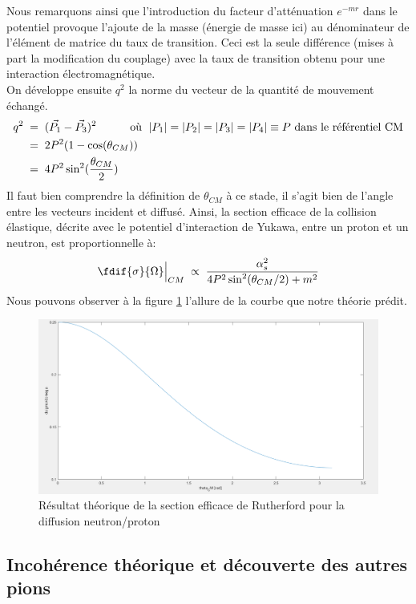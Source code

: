 Nous remarquons ainsi que l'introduction du facteur d'atténuation $e^{-mr}$ dans le potentiel provoque l'ajoute de la masse (énergie de masse ici) au dénominateur de l'élément de matrice du taux de transition. Ceci est la seule différence (mises à part la modification du couplage) avec la taux de transition obtenu pour une interaction électromagnétique.\\
On développe ensuite $q^2$ la norme du vecteur de la quantité de mouvement échangé.
\begin{align*}
    q^2 &\; = \; (\Vec{P_1} - \Vec{P_3})^2 \qquad \quad \text{où }\; |P_1| = |P_2| = |P_3| = |P_4| \equiv P \text{ dans le référentiel CM}\\
    &\; = \; 2P^2(1-\cos(\theta_{CM}))\\
    &\; = \; 4P^2\sin^2(\dfrac{\theta_{CM}}{2})
\end{align*}
Il faut bien comprendre la définition de $\theta_{CM}$ à ce stade, il s'agit bien de l'angle entre les vecteurs incident et diffusé. Ainsi, la section efficace de la collision élastique, décrite avec le potentiel d'interaction de Yukawa, entre un proton et un neutron, est proportionnelle à:
\[
    \fdif{\sigma}{\Omega}\Big|_{CM} 
    \; \propto \; \dfrac{\alpha_s^2}{4P^2\sin^2(\theta_{CM}/2) + m^2}
\]
Nous pouvons observer à la figure \ref{sect_eff_diff_np_th} l'allure de la courbe que notre théorie prédit.
\begin{figure}[H]
    \centering
    \includegraphics[scale = 0.3]{Images4/Diffusion2.PNG}
    \caption{Résultat théorique de la section efficace de Rutherford pour la diffusion neutron/proton}
    \label{sect_eff_diff_np_th}
\end{figure}


\subsection{Incohérence théorique et découverte des autres pions}


